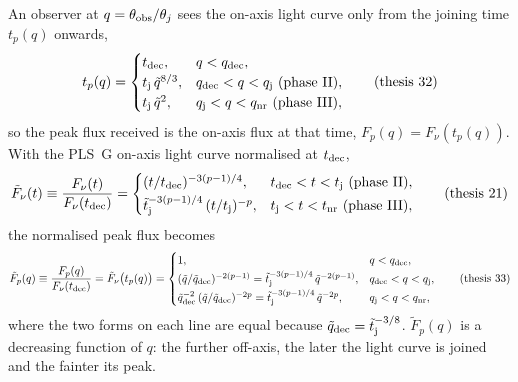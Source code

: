 \documentclass[11pt,a4paper]{article}
\newcommand{\tq}{\tilde{q}}
\newcommand{\tF}{\tilde{F}}
\newcommand{\ttj}{\tilde{t}_{\rm j}}
\newcommand{\dec}{{\rm dec}}
\newcommand{\nr}{{\rm nr}}
\newcommand{\tdec}{t_{\rm dec}}
\newcommand{\tj}{t_{\rm j}}
\begin{document}
An observer at $q=\theta_{\rm obs}/\theta_j$ sees the on-axis light curve only from the joining time $t_p(q)$ onwards,
\begin{equation}
t_p(q)=\begin{cases}\tdec, & q<q_\dec,\\ \tj\,\tq^{8/3}, & q_\dec<q<q_{\rm j}\ \text{(phase II)},\\ \tj\,\tq^{2}, & q_{\rm j}<q<q_\nr\ \text{(phase III)},\end{cases}
\tag{thesis 32}
\end{equation}
so the peak flux received is the on-axis flux at that time, $F_p(q)=F_\nu(t_p(q))$. With the PLS~G on-axis light curve normalised at $\tdec$,
\begin{equation}
\tF_\nu(t)\equiv\frac{F_\nu(t)}{F_\nu(\tdec)}=\begin{cases}(t/\tdec)^{-3(p-1)/4}, & \tdec<t<\tj\ \text{(phase II)},\\[2pt] \ttj^{-3(p-1)/4}\,(t/\tj)^{-p}, & \tj<t<t_\nr\ \text{(phase III)},\end{cases}
\tag{thesis 21}
\end{equation}
the normalised peak flux becomes
\begin{equation}
\label{eq:Fp}
\tF_p(q)\equiv\frac{F_p(q)}{F_\nu(\tdec)}=\tF_\nu\bigl(t_p(q)\bigr)=
\begin{cases}1, & q<q_\dec,\\[2pt] (\tq/\tq_\dec)^{-2(p-1)}=\ttj^{-3(p-1)/4}\,\tq^{-2(p-1)}, & q_\dec<q<q_{\rm j},\\[2pt] \tq_\dec^{-2}\,(\tq/\tq_\dec)^{-2p}=\ttj^{-3(p-1)/4}\,\tq^{-2p}, & q_{\rm j}<q<q_\nr,\end{cases}
\tag{thesis 33}
\end{equation}
where the two forms on each line are equal because $\tq_\dec=\ttj^{-3/8}$. $\tF_p(q)$ is a decreasing function of $q$: the further off-axis, the later the light curve is joined and the fainter its peak.
\end{document}
